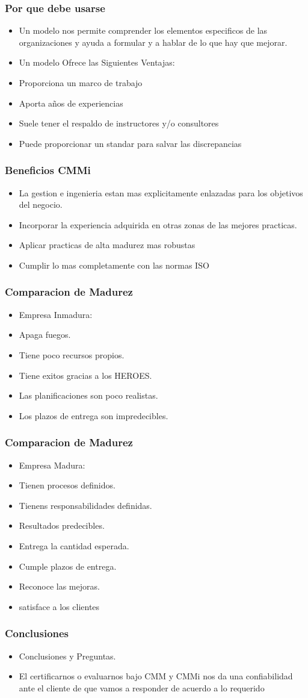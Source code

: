 \documentclass{beamer}
\begin{document}
\frame
{
  \frametitle{Por que debe usarse}
  	\begin{itemize}
  	\item<1-> Un modelo nos permite comprender los elementos especificos de las organizaciones y ayuda a formular y a hablar de lo que hay que mejorar.
  	\item<2-> Un modelo Ofrece las Siguientes Ventajas:
  	\item<3-> Proporciona un marco de trabajo
  	\item<4-> Aporta años de experiencias
  	\item<5-> Suele tener el respaldo de instructores y/o consultores
  	\item<6-> Puede proporcionar un standar para salvar las discrepancias
  	\end{itemize}
}

\frame
{
  \frametitle{Beneficios CMMi}
  	\begin{itemize}
  	\item<1-> La gestion e ingenieria estan mas explicitamente enlazadas para los objetivos del negocio.
  	\item<2-> Incorporar la experiencia adquirida en otras zonas de las mejores practicas.
  	\item<3-> Aplicar practicas de alta madurez mas robustas
  	\item<4-> Cumplir lo mas completamente con las normas ISO
  	\end{itemize}
}

\frame
{
  \frametitle{Comparacion de Madurez}
  	\begin{itemize}
  	\item<1-> Empresa Inmadura:
  	\item<2-> Apaga fuegos.
  	\item<3-> Tiene poco recursos propios.
  	\item<4-> Tiene exitos gracias a los {\Large HEROES}.
	\item<5-> Las planificaciones son poco realistas.
	\item<6-> Los plazos de entrega son impredecibles.  	
  	\end{itemize}
}

\frame
{
  \frametitle{Comparacion de Madurez}
  	\begin{itemize}
  	\item<1-> Empresa Madura:
  	\item<2-> Tienen procesos definidos.
  	\item<3-> Tienens responsabilidades definidas.
  	\item<4-> Resultados predecibles.
  	\item<5-> Entrega la cantidad esperada.
  	\item<6-> Cumple plazos de entrega.
  	\item<7-> Reconoce las mejoras.
  	\item<8-> satisface a los clientes
  	\end{itemize}
}

\frame
{
  \frametitle{Conclusiones}
  	\begin{itemize}
  	\item<1-> {\Large Conclusiones y Preguntas.}
	\item<2-> El certificarnos o evaluarnos bajo CMM y CMMi nos da una confiabilidad ante el cliente de que vamos a responder de acuerdo a lo requerido
  	\end{itemize}
}
\end{document}
